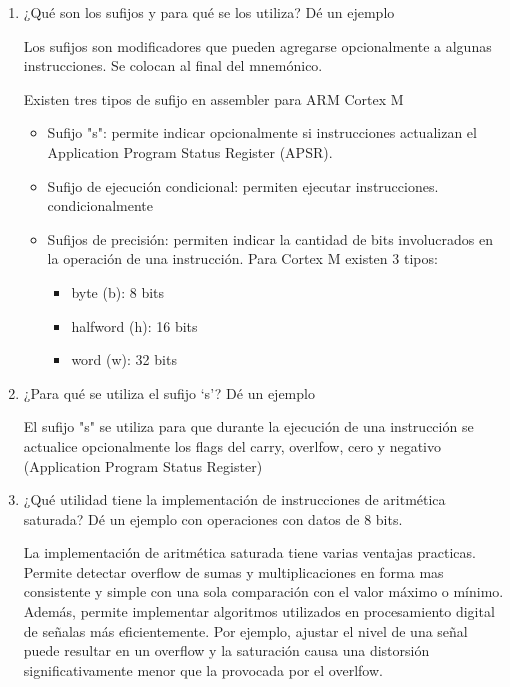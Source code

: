 \documentclass[12pt, a4paper]{article}
\begin{document}
\begin{enumerate}
    \item ¿Qué son los sufijos y para qué se los utiliza? Dé un ejemplo
    
    Los sufijos son modificadores que pueden agregarse opcionalmente a algunas instrucciones. Se 
    colocan al final del mnemónico.
    
    Existen tres tipos de sufijo en assembler para ARM Cortex M
    
    \begin{itemize}
        \item Sufijo "s": permite indicar opcionalmente si instrucciones actualizan el 
        Application Program Status Register (APSR).
        \item Sufijo de ejecución condicional: permiten ejecutar instrucciones.
        condicionalmente
        \item Sufijos de precisión: permiten indicar la cantidad de bits involucrados en la operación
        de una instrucción. Para Cortex M existen 3 tipos:
        \begin{itemize}
            \item byte (b): 8 bits
            \item halfword (h): 16 bits
            \item word (w): 32 bits
        \end{itemize}
    \end{itemize}

    \item ¿Para qué se utiliza el sufijo ‘s’? Dé un ejemplo
    
    El sufijo "s" se utiliza para que durante la ejecución de una instrucción se actualice 
    opcionalmente los flags del carry, overlfow, cero y negativo (Application Program Status Register)
    
    \item ¿Qué utilidad tiene la implementación de instrucciones de aritmética saturada? Dé un 
    ejemplo con operaciones con datos de 8 bits.
    
    La implementación de aritmética saturada tiene varias ventajas practicas. Permite detectar overflow 
    de sumas y multiplicaciones en forma mas consistente y simple con una sola comparación con el valor
    máximo o mínimo. Además, permite implementar algoritmos utilizados en procesamiento digital de
    señalas más eficientemente. Por ejemplo, ajustar el nivel de una señal puede resultar en un overflow
    y la saturación causa una distorsión significativamente menor que la provocada por el overlfow.
    

\end{enumerate}
\end{document}
